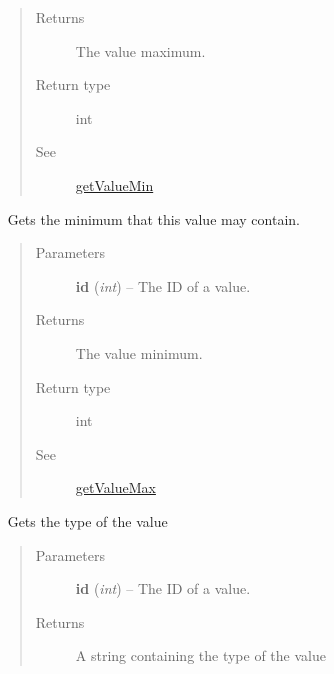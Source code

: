 \documentclass[letterpaper,10pt,english]{sphinxmanual}
\begin{document}
\begin{fulllineitems}
\begin{fulllineitems}
\begin{quote}
\begin{description}
\item[{Returns}] \leavevmode
The value maximum.

\item[{Return type}] \leavevmode
int

\item[{See}] \leavevmode
{\hyperref[libopenzwave:getvaluemin]{getValueMin}}

\end{description}\end{quote}

\end{fulllineitems}


\begin{fulllineitems}
\label{libopenzwave:libopenzwave.PyManager.getValueMin}~\label{libopenzwave:getvaluemin}
Gets the minimum that this value may contain.
\begin{quote}\begin{description}
\item[{Parameters}] \leavevmode
\textbf{id} (\emph{int}) -- The ID of a value.

\item[{Returns}] \leavevmode
The value minimum.

\item[{Return type}] \leavevmode
int

\item[{See}] \leavevmode
{\hyperref[libopenzwave:getvaluemax]{getValueMax}}

\end{description}\end{quote}

\end{fulllineitems}


\begin{fulllineitems}
\label{libopenzwave:libopenzwave.PyManager.getValueType}~\label{libopenzwave:getvaluetype}
Gets the type of the value
\begin{quote}\begin{description}
\item[{Parameters}] \leavevmode
\textbf{id} (\emph{int}) -- The ID of a value.

\item[{Returns}] \leavevmode
A string containing the type of the value


\end{description}
\end{quote}
\end{fulllineitems}
\end{fulllineitems}
\end{document}
